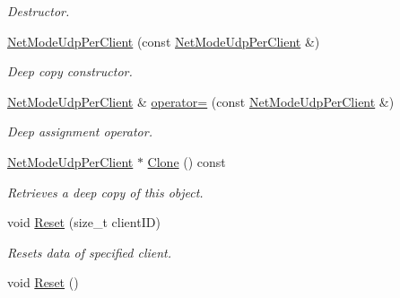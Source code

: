 \begin{DoxyCompactItemize}
\begin{DoxyCompactList}\small\item\em Destructor. \item\end{DoxyCompactList}\item 
\hyperlink{class_net_mode_udp_per_client_ad2a548a659865d79e946c38b1a32c6f9}{NetModeUdpPerClient} (const \hyperlink{class_net_mode_udp_per_client}{NetModeUdpPerClient} \&)
\begin{DoxyCompactList}\small\item\em Deep copy constructor. \item\end{DoxyCompactList}\item 
\hyperlink{class_net_mode_udp_per_client}{NetModeUdpPerClient} \& \hyperlink{class_net_mode_udp_per_client_a5597847c3bea6af583c3b72eaa722cc8}{operator=} (const \hyperlink{class_net_mode_udp_per_client}{NetModeUdpPerClient} \&)
\begin{DoxyCompactList}\small\item\em Deep assignment operator. \item\end{DoxyCompactList}\item 
\hyperlink{class_net_mode_udp_per_client}{NetModeUdpPerClient} $\ast$ \hyperlink{class_net_mode_udp_per_client_a41f1ee8314171e36a91e17d9e24420ae}{Clone} () const 
\begin{DoxyCompactList}\small\item\em Retrieves a deep copy of this object. \item\end{DoxyCompactList}\item 
void \hyperlink{class_net_mode_udp_per_client_aa036644d4e71e779032f6cef6959f826}{Reset} (size\_\-t clientID)
\begin{DoxyCompactList}\small\item\em Resets data of specified client. \item\end{DoxyCompactList}\item 
\hypertarget{class_net_mode_udp_per_client_a503ba4e03ba1766070561a27fd59c628}{
void \hyperlink{class_net_mode_udp_per_client_a503ba4e03ba1766070561a27fd59c628}{Reset} ()}
\label{class_net_mode_udp_per_client_a503ba4e03ba1766070561a27fd59c628}


\end{DoxyCompactItemize}
